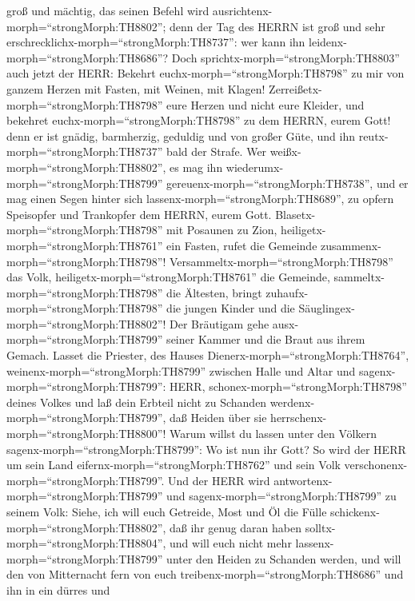 groß und mächtig, das seinen Befehl wird
ausrichtenx-morph=``strongMorph:TH8802''; denn der Tag des HERRN ist
groß und sehr erschrecklichx-morph=``strongMorph:TH8737'': wer kann ihn
leidenx-morph=``strongMorph:TH8686''?  Doch
sprichtx-morph=``strongMorph:TH8803'' auch jetzt der HERR: Bekehrt
euchx-morph=``strongMorph:TH8798'' zu mir von ganzem Herzen mit Fasten,
mit Weinen, mit Klagen! 
Zerreißetx-morph=``strongMorph:TH8798'' eure Herzen und nicht eure
Kleider, und bekehret euchx-morph=``strongMorph:TH8798'' zu dem HERRN,
eurem Gott! denn er ist gnädig, barmherzig, geduldig und von großer
Güte, und ihn reutx-morph=``strongMorph:TH8737'' bald der Strafe.
 Wer weißx-morph=``strongMorph:TH8802'', es mag ihn
wiederumx-morph=``strongMorph:TH8799''
gereuenx-morph=``strongMorph:TH8738'', und er mag einen Segen hinter
sich lassenx-morph=``strongMorph:TH8689'', zu opfern Speisopfer und
Trankopfer dem HERRN, eurem Gott. 
Blasetx-morph=``strongMorph:TH8798'' mit Posaunen zu Zion,
heiligetx-morph=``strongMorph:TH8761'' ein Fasten, rufet die Gemeinde
zusammenx-morph=``strongMorph:TH8798''! 
Versammeltx-morph=``strongMorph:TH8798'' das Volk,
heiligetx-morph=``strongMorph:TH8761'' die Gemeinde,
sammeltx-morph=``strongMorph:TH8798'' die Ältesten, bringt
zuhaufx-morph=``strongMorph:TH8798'' die jungen Kinder und die
Säuglingex-morph=``strongMorph:TH8802''! Der Bräutigam gehe
ausx-morph=``strongMorph:TH8799'' seiner Kammer und die Braut aus ihrem
Gemach.  Lasset die Priester, des Hauses
Dienerx-morph=``strongMorph:TH8764'',
weinenx-morph=``strongMorph:TH8799'' zwischen Halle und Altar und
sagenx-morph=``strongMorph:TH8799'': HERR,
schonex-morph=``strongMorph:TH8798'' deines Volkes und laß dein Erbteil
nicht zu Schanden werdenx-morph=``strongMorph:TH8799'', daß Heiden über
sie herrschenx-morph=``strongMorph:TH8800''! Warum willst du lassen
unter den Völkern sagenx-morph=``strongMorph:TH8799'': Wo ist nun ihr
Gott?  So wird der HERR um sein Land
eifernx-morph=``strongMorph:TH8762'' und sein Volk
verschonenx-morph=``strongMorph:TH8799''.  Und der HERR
wird antwortenx-morph=``strongMorph:TH8799'' und
sagenx-morph=``strongMorph:TH8799'' zu seinem Volk: Siehe, ich will euch
Getreide, Most und Öl die Fülle schickenx-morph=``strongMorph:TH8802'',
daß ihr genug daran haben solltx-morph=``strongMorph:TH8804'', und will
euch nicht mehr lassenx-morph=``strongMorph:TH8799'' unter den Heiden zu
Schanden werden,  und will den von Mitternacht fern von
euch treibenx-morph=``strongMorph:TH8686'' und ihn in ein dürres und
